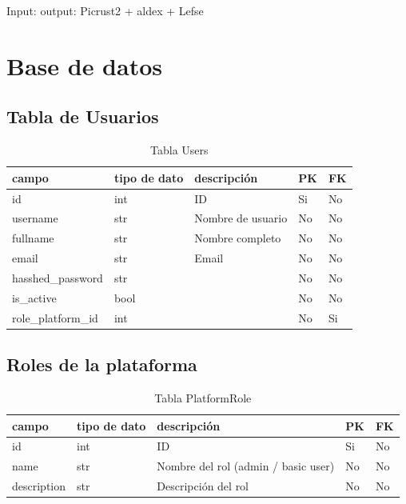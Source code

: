 \begin{itemize}
Input:
output:
Picrust2 + aldex + Lefse

\section{Base de datos}


\subsection{Tabla de Usuarios}
\begin{table}[H]
    \begin{tabular}{|l|l|l|l|l|}
        \hline
        campo              & tipo de dato & descripción       & PK & FK \\ \hline
        id                 & int          & ID                & Si & No \\ \hline
        username           & str          & Nombre de usuario & No & No \\ \hline
        fullname           & str          & Nombre completo   & No & No \\ \hline
        email              & str          & Email             & No & No \\ \hline
        hasshed\_password  & str          &                   & No & No \\ \hline
        is\_active         & bool         &                   & No & No \\ \hline
        role\_platform\_id & int          &                   & No & Si \\ \hline
    \end{tabular}
    \caption{Tabla Users}
    \label{tab:db-users}
\end{table}
\subsection{Roles de la plataforma}
\begin{table}[H]
    \begin{tabular}{|l|l|l|l|l|}
        \hline
        campo       & tipo de dato & descripción                         & PK & FK \\ \hline
        id          & int          & ID                                  & Si & No \\ \hline
        name        & str          & Nombre del rol (admin / basic user) & No & No \\ \hline
        description & str          & Descripción del rol                 & No & No \\ \hline
    \end{tabular}
    \caption{Tabla PlatformRole}
    \label{tab:db-platformRole}
\end{table}

\end{itemize}
